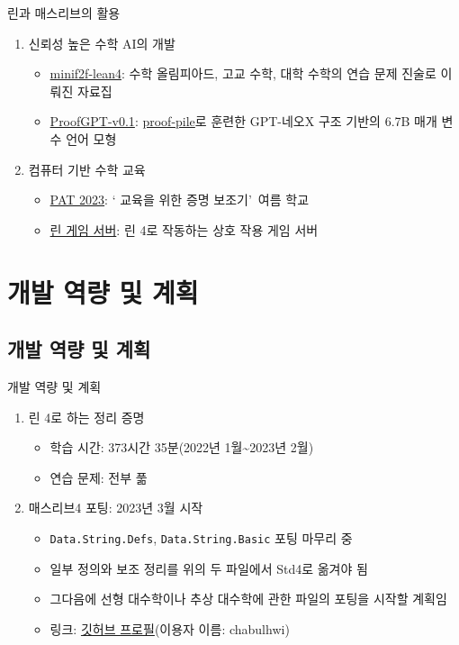 \documentclass{beamer}
\begin{document}
\begin{frame}{린과 매스리브의 활용}
  \begin{enumerate}
    \item 신뢰성 높은 수학 AI의 개발
    \begin{itemize}
      \item \href{https://huggingface.co/hoskinson-center/minif2f-lean4}{minif2f-lean4}:
            수학 올림피아드, 고교 수학, 대학 수학의 연습 문제 진술로 이뤄진
            자료집
      \item \href{https://huggingface.co/hoskinson-center/proofGPT-v0.1-6.7B}{ProofGPT-v0.1}:
            \href{https://huggingface.co/datasets/hoskinson-center/proof-pile}{proof-pile}로
            훈련한 GPT-네오X 구조 기반의 6.7B 매개 변수 언어 모형
    \end{itemize}
    \item 컴퓨터 기반 수학 교육
    \begin{itemize}
      \item \href{https://pat2023.icube.unistra.fr/}{PAT 2023}: \textquoteleft
            교육을 위한 증명 보조기\textquoteright\ 여름 학교
      \item \href{https://adam.math.hhu.de/}{린 게임 서버}: 린 4로 작동하는 상호
            작용 게임 서버
    \end{itemize}
  \end{enumerate}
\end{frame}

\section{개발 역량 및 계획}

\subsection{개발 역량 및 계획}

\begin{frame}[fragile]{개발 역량 및 계획}
  \begin{enumerate}
    \item 린 4로 하는 정리 증명 \autocite{tpil4}
    \begin{itemize}
      \item 학습 시간: 373시간 35분(2022년 1월\textasciitilde2023년 2월)
      \item 연습 문제: 전부 풂
    \end{itemize}
    \item 매스리브4 포팅: 2023년 3월 시작
    \begin{itemize}
      \item \verb|Data.String.Defs|, \verb|Data.String.Basic| 포팅 마무리 중
      \item 일부 정의와 보조 정리를 위의 두 파일에서 Std4로 옮겨야 됨
      \item 그다음에 선형 대수학이나 추상 대수학에 관한 파일의 포팅을 시작할 계획임
      \item 링크: \href{https://github.com/chabulhwi/}{깃허브 프로필}(이용자 이름:
      chabulhwi)
    \end{itemize}
  \end{enumerate}
\end{frame}
\end{document}

